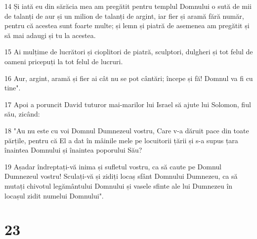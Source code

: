 \par 14 Și iată eu din sărăcia mea am pregătit pentru templul Domnului o sută de mii de talanți de aur și un milion de talanți de argint, iar fier și aramă fără număr, pentru că acestea sunt foarte multe; și lemn și piatră de asemenea am pregătit și să mai adaugi și tu la acestea.
\par 15 Ai mulțime de lucrători și cioplitori de piatră, sculptori, dulgheri și tot felul de oameni pricepuți la tot felul de lucruri.
\par 16 Aur, argint, aramă și fier ai cât nu se pot cântări; începe și fă! Domnul va fi cu tine".
\par 17 Apoi a poruncit David tuturor mai-marilor lui Israel să ajute lui Solomon, fiul său, zicând:
\par 18 "Au nu este cu voi Domnul Dumnezeul vostru, Care v-a dăruit pace din toate părțile, pentru că El a dat în mâinile mele pe locuitorii țării și s-a supus țara înaintea Domnului și înaintea poporului Său?
\par 19 Așadar îndreptați-vă inima și sufletul vostru, ca să caute pe Domnul Dumnezeul vostru! Sculați-vă și zidiți locaș sfânt Domnului Dumnezeu, ca să mutați chivotul legământului Domnului și vasele sfinte ale lui Dumnezeu în locașul zidit numelui Domnului".

\chapter{23}


